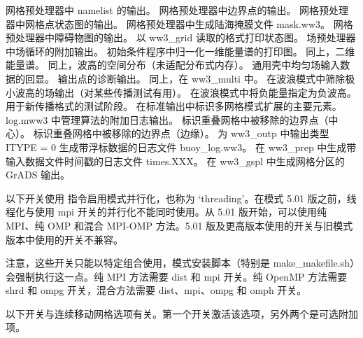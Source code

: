 \begin{slist}
  {网格预处理器中 namelist 的输出。}
  {网格预处理器中边界点的输出。}
  {网格预处理器中网格点状态图的输出。}
 {网格预处理器中生成陆海掩膜文件 {\file mask.ww3}。}
 {网格预处理器中障碍物图的输出。}
 {以 {\file ww3\_grid} 读取的格式打印状态图。}
  {场预处理器中场循环的附加输出。}
  {初始条件程序中归一化一维能量谱的打印图。}
  {同上，二维能量谱。}
  {同上，波高的空间分布（未适配分布式内存）。}
  {通用壳中均匀场输入数据的回显。}
 {输出点的诊断输出。}
 {同上，在 {\file ww3\_multi} 中。}
  {在波浪模式中筛除极小波高的场输出（对某些传播测试有用）。}
  {在波浪模式中将负能量指定为负波高。用于新传播格式的测试阶段。}
 {在标准输出中标识多网格模式扩展的主要元素。}
 {{\file log.mww3} 中管理算法的附加日志输出。}
 {标识重叠网格中被移除的边界点（中心）。}
 {标识重叠网格中被移除的边界点（边缘）。}
 {为 {\file ww3\_outp} 中输出类型 {\code ITYPE = 0} 生成带浮标数据的日志文件 {\file buoy\_log.ww3}。}
 {在 {\file ww3\_prep} 中生成带输入数据文件时间戳的日志文件 {\file times.XXX}。}
 {在 {\file ww3\_gspl} 中生成网格分区的 GrADS 输出。}
\end{slist}

\noindent
以下开关使用 \omp{} 指令启用模式并行化，也称为 `threading'。在模式 5.01 版之前，线程化与使用 {\sc mpi} 开关的并行化不能同时使用。从 5.01 版开始，可以使用纯 MPI、纯 OMP 和混合 MPI-OMP 方法。5.01 版及更高版本使用的开关与旧模式版本中使用的开关不兼容。
\begin{slist}
\end{slist}
注意，这些开关只能以特定组合使用，模式安装脚本（特别是 {\file make\_makefile.sh}）会强制执行这一点。纯 MPI 方法需要 {\F dist} 和 {\F mpi} 开关。纯 OpenMP 方法需要 {\F shrd} 和 {\F ompg} 开关，混合方法需要 {\F dist}、{\F mpi}、{\F ompg} 和 {\F omph} 开关。

\vspace{\baselineskip}
\noindent
以下开关与连续移动网格选项有关。第一个开关激活该选项，另外两个是可选附加项。
\begin{slist}
\end{slist}

